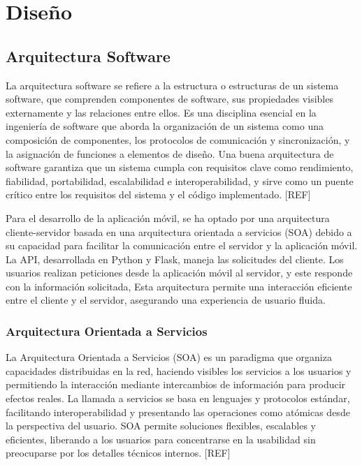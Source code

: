 \chapter{Diseño}

\section{Arquitectura Software}

La arquitectura software se refiere a la estructura o estructuras de un sistema software, que comprenden componentes de software, sus propiedades visibles externamente y las relaciones entre ellos. Es una disciplina esencial en la ingeniería de software que aborda la organización de un sistema como una composición de componentes, los protocolos de comunicación y sincronización, y la asignación de funciones a elementos de diseño. Una buena arquitectura de software garantiza que un sistema cumpla con requisitos clave como rendimiento, fiabilidad, portabilidad, escalabilidad e interoperabilidad, y sirve como un puente crítico entre los requisitos del sistema y el código implementado. [REF]

Para el desarrollo de la aplicación móvil, se ha optado por una arquitectura cliente-servidor basada en una arquitectura orientada a servicios (SOA) debido a su capacidad para facilitar la comunicación entre el servidor y la aplicación móvil. La API, desarrollada en Python y Flask, maneja las solicitudes del cliente. Los usuarios realizan peticiones desde la aplicación móvil al servidor, y este responde con la información solicitada, Esta arquitectura permite una interacción eficiente entre el cliente y el servidor, asegurando una experiencia de usuario fluida.


\subsection{Arquitectura Orientada a Servicios}

La Arquitectura Orientada a Servicios (SOA) es un paradigma que organiza capacidades distribuidas en la red, haciendo visibles los servicios a los usuarios y permitiendo la interacción mediante intercambios de información para producir efectos reales. La llamada a servicios se basa en lenguajes y protocolos estándar, facilitando interoperabilidad y presentando las operaciones como atómicas desde la perspectiva del usuario. SOA permite soluciones flexibles, escalables y eficientes, liberando a los usuarios para concentrarse en la usabilidad sin preocuparse por los detalles técnicos internos. [REF]

